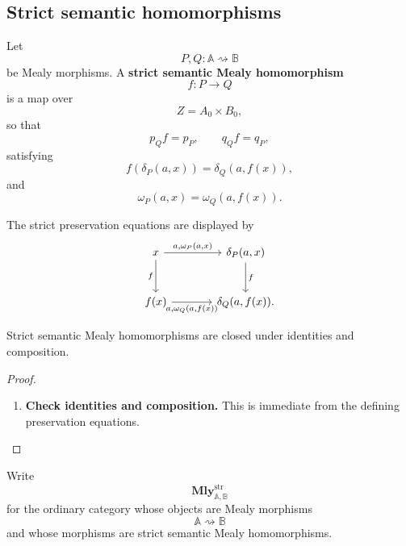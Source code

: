 \subsection{Strict semantic homomorphisms}
\label{subsec:strict-semantic-homomorphisms}

\begin{definition}
\label{def:strict-semantic-mealy-homomorphism}
    Let
    \[
        P,Q:\mathbb A\rightsquigarrow\mathbb B
    \]
    be Mealy morphisms. A \textbf{strict semantic Mealy homomorphism}
    \[
        f:P\to Q
    \]
    is a map over
    \[
        Z=A_0\times B_0,
    \]
    so that
    \[
        p_Qf=p_P,
        \qquad
        q_Qf=q_P,
    \]
    satisfying
    \[
        f(\delta_P(a,x))=\delta_Q(a,f(x)),
    \]
    and
    \[
        \omega_P(a,x)=\omega_Q(a,f(x)).
    \]
\end{definition}

The strict preservation equations are displayed by
\[
    \begin{tikzcd}[column sep=large, row sep=large]
        x
            \arrow[r, "{a,\omega_P(a,x)}"]
            \arrow[d, "f"']
        &
            \delta_P(a,x)
                \arrow[d, "f"]
        \\
            f(x)
                \arrow[r, "{a,\omega_Q(a,f(x))}"']
        &
            \delta_Q(a,f(x)).
    \end{tikzcd}
\]

\begin{lemma}
\label{lem:strict-semantic-category}
    Strict semantic Mealy homomorphisms are closed under identities and composition.
\end{lemma}
\begin{proof}
    \leavevmode
    \begin{enumerate}
        \item \textbf{Check identities and composition.} This is immediate from the defining preservation equations.
    \end{enumerate}
\end{proof}

\begin{notation}
\label{not:strict-semantic-category}
    Write
    \[
        \mathbf{Mly}^{\mathrm{str}}_{\mathbb A,\mathbb B}
    \]
    for the ordinary category whose objects are Mealy morphisms
    \[
        \mathbb A\rightsquigarrow\mathbb B
    \]
    and whose morphisms are strict semantic Mealy homomorphisms.
\end{notation}

